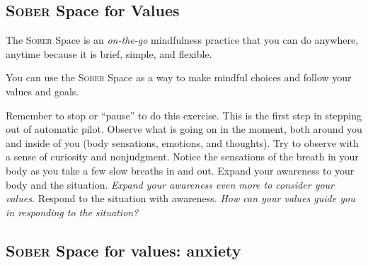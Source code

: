 	\clearpage
	\subsection{\textsc{Sober} Space for Values}
		The \textsc{Sober} Space is an \emph{on-the-go} mindfulness practice that you can do anywhere, anytime because it is brief, simple, and flexible.

		You can use the \textsc{Sober} Space as a way to make mindful choices and follow your values and goals.

		\begin{itemize}[leftmargin=10mm]
			 Remember to stop or “pause” to do this exercise. This is the first step in stepping out of automatic pilot. 
			 Observe what is going on in the moment, both around you and inside of you (body sensations, emotions, and thoughts). Try to observe with a sense of curiosity and nonjudgment. 
			 Notice the sensations of the breath in your body as you take a few slow breaths in and out. 
			 Expand your awareness to your body and the situation. \emph{Expand your awareness even more to consider your values.}
			 Respond to the situation with awareness. \emph{How can your values guide you in responding to the situation?}
		\end{itemize}
	\clearpage

	\subsection{\textsc{Sober} Space for values: anxiety}
	\clearpage
